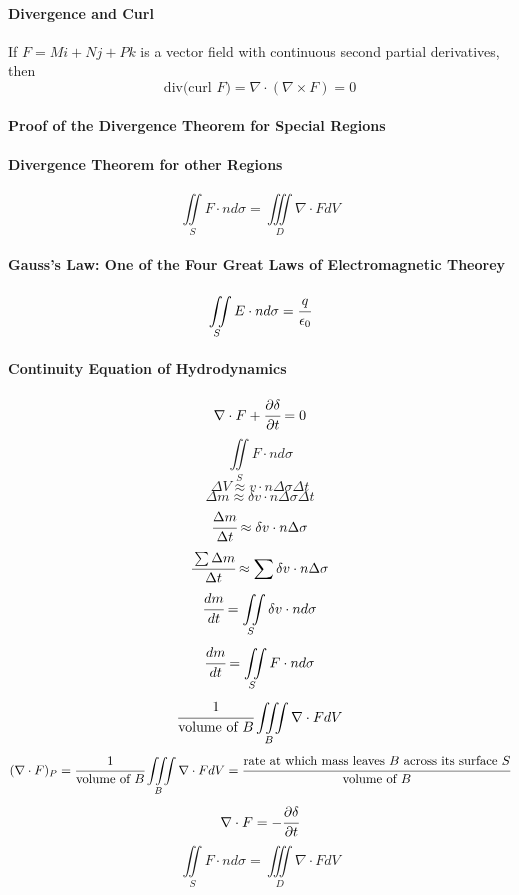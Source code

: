\documentclass{article}
\begin{document}
            \paragraph{Divergence and Curl}
                If $F=Mi+Nj+Pk$ is a vector field with continuous second partial derivatives, then
                \[\text{div(curl $F$)}=\nabla\cdot(\nabla\times F)=0\]
            \paragraph{Proof of the Divergence Theorem for Special Regions}
            \paragraph{Divergence Theorem for other Regions}
                \[\iint\limits_SF\cdot nd\sigma=\iiint\limits_D\nabla\cdot FdV\]
            \paragraph{Gauss's Law: One of the Four Great Laws of Electromagnetic Theorey}
            \[\iint\limits_SE\cdot nd\sigma=\cfrac{q}{\epsilon_0}\]
            \paragraph{Continuity Equation of Hydrodynamics}
                \[\nabla\cdot F+\cfrac{\partial \delta}{\partial t}=0\]
                \[\iint\limits_S F\cdot nd\sigma\]
                \[\Delta V\approx v\cdot n\Delta\sigma\Delta t\]
                \[\Delta m\approx \delta v\cdot n\Delta\sigma\Delta t\]
                \[\cfrac{\Delta m}{\Delta t}\approx \delta v\cdot n\Delta\sigma\]
                \[\cfrac{\sum\Delta m}{\Delta t}\approx\sum\delta v\cdot n\Delta \sigma\]
                \[\cfrac{dm}{dt}=\iint\limits_S\delta v\cdot nd\sigma\]
                \[\cfrac{dm}{dt}=\iint\limits_S F\cdot nd\sigma\]
                \[\cfrac{1}{\text{volume of }B}\iiint\limits_B\nabla\cdot F dV\]
                \[(\nabla\cdot F)_P=\cfrac{1}{\text{volume of }B}\iiint\limits_B\nabla\cdot FdV=\cfrac{\text{rate at which mass leaves $B$ across its surface $S$}}{\text{volume of $B$}}\]
                \[\nabla\cdot F=-\cfrac{\partial\delta}{\partial t}\]
                \[\iint\limits_SF\cdot nd\sigma=\iiint\limits_D\nabla\cdot F dV\]
\end{document}
